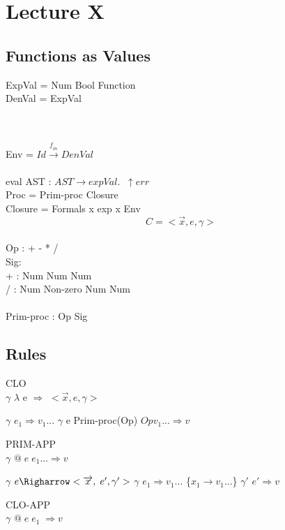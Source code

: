 \chapter{Lecture X}

\section{Functions as Values}
ExpVal = Num \textbar\; Bool \textbar\; Function
\\ DenVal = ExpVal

\\ \\ Env = $Id \xrightarrow{\mathit{f_{in}}} DenVal$ 
\\ \\ eval AST : $AST \rightarrow expVal . \;\; \uparrow err$
\\ Proc = Prim-proc \textbar\; Closure
\\ Closure = Formals x exp x Env
$$C = <\overrightarrow{x},e,\gamma>$$
\\ Op : + \textbar\; - \textbar\; * \textbar\; / 
\\ Sig:
\\ + : Num \times Num \rightarrow Num
\\ / : Num \times Non-zero \; Num \rightarrow Num 
\\ \\ Prim-proc : Op \times Sig

\section{Rules}
\par\hrulefill{\textwidth}CLO
\\$\gamma$ \textbar\; $\lambda$  \; e \; \; $\Rightarrow$ \; \; $<\overrightarrow{x},e,\gamma>$

\vspace{10mm}
$\gamma$ \textbar \; $e_{1} \Rightarrow v_{1} . . . $ \hspace{1cm} $\gamma$ \textbar\; e \Rightarrow Prim-proc(Op) \hspace{1cm}  $Op v_{1} . . . \Rightarrow v$
\par\hrulefill{\textwidth}PRIM-APP
\\ $\gamma$ \textbar\; $@ \; e \; e_{1} . . . \Rightarrow v$


\vspace{10mm}
$\gamma$ \textbar\; $e \Righarrow <\overrightarrow{x},\; e', \gamma'>$ \hspace{1cm} $\gamma$ \textbar\; $e_1 \Rightarrow v_1 . . .$ \hspace{1cm} 
\{$x_1 \rightarrow v_1 . . .$\} $\gamma'$ \textbar\; $e' \Rightarrow v$
\par\hrulefill{\textwidth}CLO-APP
\\ $\gamma$ \textbar\; $@ \; e \; e_1 \; \Rightarrow v$

